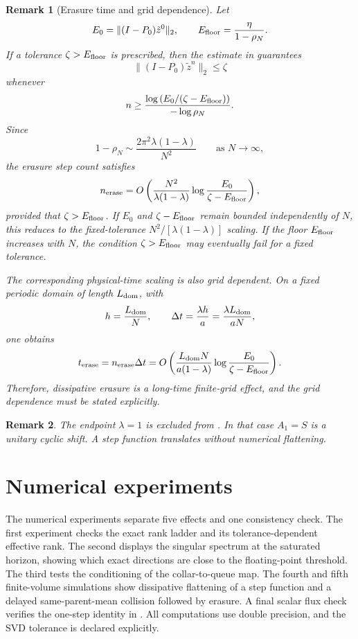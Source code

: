 \documentclass[pdflatex,sn-mathphys-num]{sn-jnl}%
\newtheorem{remark}{Remark}
\theoremstyle{thmstyleone}%
\theoremstyle{thmstyletwo}%
\theoremstyle{thmstylethree}%
\begin{document}
\begin{remark}[Erasure time and grid dependence]
\label{rem:erasure-time}
Let
\[
  E_0=\|(I-P_0)\tilde z^0\|_2,
  \qquad
  E_{\rm floor}=\frac{\eta}{1-\rho_N}.
\]
If a tolerance \(\zeta>E_{\rm floor}\) is prescribed, then the estimate in  guarantees
\[
  \|(I-P_0)\tilde z^n\|_2\le \zeta
\]
whenever
\[
  n
  \ge
  \frac{\log\left(E_0/(\zeta-E_{\rm floor})\right)}
       {-\log \rho_N}.
\]
Since
\[
  1-\rho_N
  \sim
  \frac{2\pi^2\lambda(1-\lambda)}{N^2}
  \qquad
  \text{as }N\to\infty,
\]
the erasure step count satisfies
\[
  n_{\rm erase}
  =
  O\left(
  \frac{N^2}{\lambda(1-\lambda)}
  \log\frac{E_0}{\zeta-E_{\rm floor}}
  \right),
\]
provided that \(\zeta>E_{\rm floor}\).  If \(E_0\) and \(\zeta-E_{\rm floor}\) remain bounded independently of \(N\), this reduces to the fixed-tolerance \(N^2/[\lambda(1-\lambda)]\) scaling.  If the floor \(E_{\rm floor}\) increases with \(N\), the condition \(\zeta>E_{\rm  floor}\) may eventually fail for a fixed tolerance.

The corresponding physical-time scaling is also grid dependent.  On a fixed periodic domain of length \(L_{\rm dom}\), with
\[
  h=\frac{L_{\rm dom}}{N},
  \qquad
  \Delta t=\frac{\lambda h}{a}
  =
  \frac{\lambda L_{\rm dom}}{aN},
\]
one obtains
\[
  t_{\rm erase}
  =
  n_{\rm erase}\Delta t
  =
  O\left(
  \frac{L_{\rm dom}N}{a(1-\lambda)}
  \log\frac{E_0}{\zeta-E_{\rm floor}}
  \right).
\]
Therefore, dissipative erasure is a long-time finite-grid effect, and the grid dependence must be stated explicitly.
\end{remark}

\begin{remark}
The endpoint \(\lambda=1\) is excluded from .  In that
case \(A_1=S\) is a unitary cyclic shift.  A step function translates without numerical flattening.
\end{remark}

\section{Numerical experiments}
\label{sec:num_exp}

The numerical experiments separate five effects and one consistency check.
The first experiment checks the exact rank ladder and its tolerance-dependent
effective rank.  The second displays the singular spectrum at the saturated
horizon, showing which exact directions are close to the floating-point
threshold.  The third tests the conditioning of the collar-to-queue map.  The fourth and fifth finite-volume simulations show dissipative flattening of a step function and a delayed same-parent-mean collision followed by erasure.  A
final scalar flux check verifies the one-step identity in .  All computations use double precision, and the SVD tolerance is declared explicitly.
\end{document}
